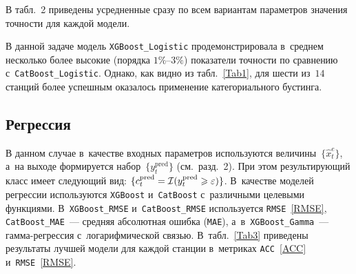 \begin{multicols}{2}
В табл.~2 приведены усредненные сразу по всем вариантам 
параметров значения точности для каж\-дой модели.

В данной задаче модель \verb"XGBoost_Logistic" продемонстрировала в~среднем 
несколько более высокие (порядка $1\%\mbox{--}3\%$) показатели точ\-ности по сравнению
 с~\verb"CatBoost_Logistic". Однако, как видно из табл.~\ref{Tab1}, для шести 
 из~$14$  станций более успешным оказалось применение категориального бустинга.

\subsection{Регрессия}

В данном случае в~качестве входных параметров используются величины~$\{\hat{x}^e_t\}$, 
а~на выходе формируется набор~$\{y^{\mathrm{pred}}_t\}$ (см.\ разд.~2). 
При этом результирующий класс имеет следующий вид: $\{ c^{\mathrm{pred}}_t \hm=
\mathcal {I} (y^{\mathrm{pred}}_t\hm\geqslant \varepsilon)\}$. 
В~качестве моделей регрессии используются \verb"XGBoost" и~\verb"CatBoost" 
с~различными целевыми функциями. В~\verb"XGBoost_RMSE" и~\verb"CatBoost_RMSE" 
используется \verb"RMSE"~\eqref{RMSE}, \verb"CatBoost_MAE"~--- 
средняя абсолютная ошибка (\verb"MAE"), а~в~\verb"XGBoost_Gamma"~--- 
гам\-ма-ре\-грес\-сия с~логарифмической связью. 
В~табл.~\ref{Tab3} приведены результаты лучшей модели для каждой станции 
в~метриках \verb"ACC"~\eqref{ACC} и~\verb"RMSE"~\eqref{RMSE}.

\setcounter{table}{3}
\begin{table*}\small %
\begin{center}
\vspace*{2ex}


\end{center}
\end{table*}
\end{multicols}

